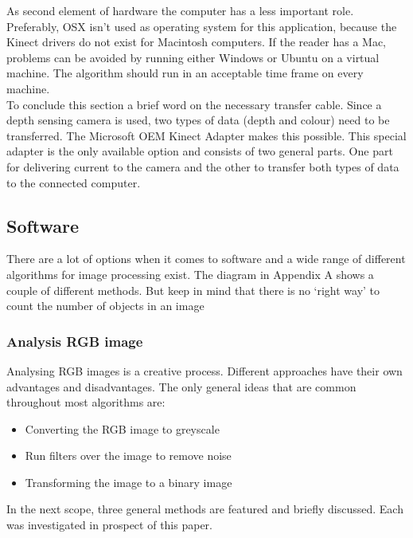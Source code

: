 \documentclass{article}
\begin{document}
As second element of hardware the computer has a less important role. Preferably, OSX isn't used as operating system for this application, because the Kinect drivers do not exist for Macintosh computers. If the reader has a Mac, problems can be avoided by running either Windows or Ubuntu on a virtual machine. The algorithm should run in an acceptable time frame on every machine.\\
To conclude this section a brief word on the necessary transfer cable. Since a depth sensing camera is used, two types of data (depth and colour) need to be transferred. The Microsoft OEM Kinect Adapter makes this possible. This special adapter is the only available option and consists of two general parts. One part for delivering current to the camera and the other to transfer both types of data to the connected computer.

\subsection{Software}
There are a lot of options when it comes to software and a wide range of different algorithms for image processing exist. The diagram in Appendix A shows a couple of different methods. But keep in mind that there is no ‘right ­way’ to count the number of objects in an image

\subsubsection{Analysis RGB image}
Analysing RGB images is a creative process. Different approaches have their own advantages and disadvantages. The only general ideas that are common throughout most algorithms are:
\begin{itemize}
\item Converting the RGB image to greyscale
\item Run filters over the image to remove noise
\item Transforming the image to a binary image
\end{itemize}
In the next scope, three general methods are featured and briefly discussed. Each was investigated in prospect of this paper.
\end{document}
